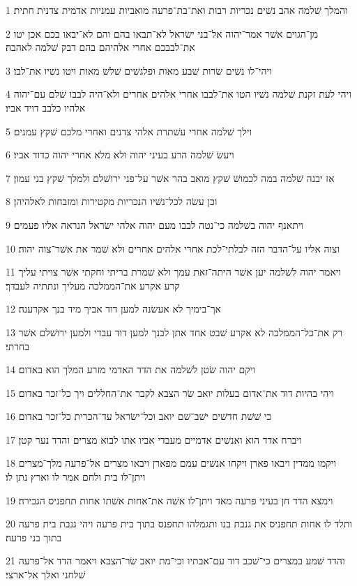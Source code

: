 \par 1 והמלך שׁלמה אהב נשׁים נכריות רבות ואת־בת־פרעה מואביות עמניות אדמית צדנית חתית׃
\par 2 מן־הגוים אשׁר אמר־יהוה אל־בני ישׂראל לא־תבאו בהם והם לא־יבאו בכם אכן יטו את־לבבכם אחרי אלהיהם בהם דבק שׁלמה לאהבה׃
\par 3 ויהי־לו נשׁים שׂרות שׁבע מאות ופלגשׁים שׁלשׁ מאות ויטו נשׁיו את־לבו׃
\par 4 ויהי לעת זקנת שׁלמה נשׁיו הטו את־לבבו אחרי אלהים אחרים ולא־היה לבבו שׁלם עם־יהוה אלהיו כלבב דויד אביו׃
\par 5 וילך שׁלמה אחרי עשׁתרת אלהי צדנים ואחרי מלכם שׁקץ עמנים׃
\par 6 ויעשׂ שׁלמה הרע בעיני יהוה ולא מלא אחרי יהוה כדוד אביו׃
\par 7 אז יבנה שׁלמה במה לכמושׁ שׁקץ מואב בהר אשׁר על־פני ירושׁלם ולמלך שׁקץ בני עמון׃
\par 8 וכן עשׂה לכל־נשׁיו הנכריות מקטירות ומזבחות לאלהיהן׃
\par 9 ויתאנף יהוה בשׁלמה כי־נטה לבבו מעם יהוה אלהי ישׂראל הנראה אליו פעמים׃
\par 10 וצוה אליו על־הדבר הזה לבלתי־לכת אחרי אלהים אחרים ולא שׁמר את אשׁר־צוה יהוה׃
\par 11 ויאמר יהוה לשׁלמה יען אשׁר היתה־זאת עמך ולא שׁמרת בריתי וחקתי אשׁר צויתי עליך קרע אקרע את־הממלכה מעליך ונתתיה לעבדך׃
\par 12 אך־בימיך לא אעשׂנה למען דוד אביך מיד בנך אקרענה׃
\par 13 רק את־כל־הממלכה לא אקרע שׁבט אחד אתן לבנך למען דוד עבדי ולמען ירושׁלם אשׁר בחרתי׃
\par 14 ויקם יהוה שׂטן לשׁלמה את הדד האדמי מזרע המלך הוא באדום׃
\par 15 ויהי בהיות דוד את־אדום בעלות יואב שׂר הצבא לקבר את־החללים ויך כל־זכר באדום׃
\par 16 כי שׁשׁת חדשׁים ישׁב־שׁם יואב וכל־ישׂראל עד־הכרית כל־זכר באדום׃
\par 17 ויברח אדד הוא ואנשׁים אדמיים מעבדי אביו אתו לבוא מצרים והדד נער קטן׃
\par 18 ויקמו ממדין ויבאו פארן ויקחו אנשׁים עמם מפארן ויבאו מצרים אל־פרעה מלך־מצרים ויתן־לו בית ולחם אמר לו וארץ נתן לו׃
\par 19 וימצא הדד חן בעיני פרעה מאד ויתן־לו אשׁה את־אחות אשׁתו אחות תחפניס הגבירה׃
\par 20 ותלד לו אחות תחפניס את גנבת בנו ותגמלהו תחפנס בתוך בית פרעה ויהי גנבת בית פרעה בתוך בני פרעה׃
\par 21 והדד שׁמע במצרים כי־שׁכב דוד עם־אבתיו וכי־מת יואב שׂר־הצבא ויאמר הדד אל־פרעה שׁלחני ואלך אל־ארצי׃
